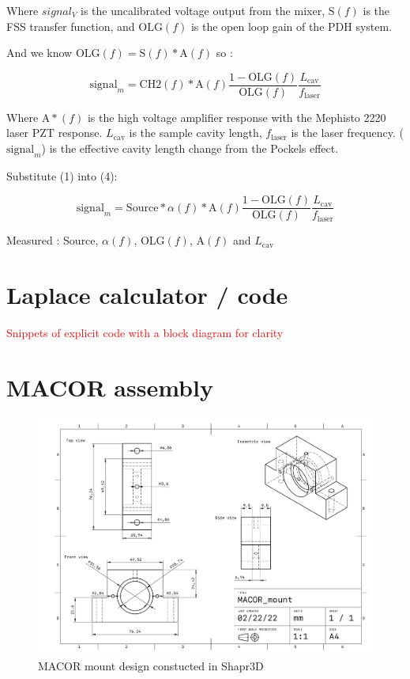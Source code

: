 Where $signal_V$ is the uncalibrated voltage output from the mixer, $\mathrm{S}(f)$ is the FSS transfer function, and $\mathrm{OLG}(f)$ is the open loop gain of the PDH system.

And we know $\mathrm{OLG}(f) = \mathrm{S}(f)*\mathrm{A}(f)$ so :

\begin{equation}
\mathrm{signal}_m = \mathrm{CH2}(f)*\mathrm{A}(f) \frac{1-\mathrm{OLG}(f)}{\mathrm{OLG}(f)} \frac{L_\mathrm{cav}}{f_\mathrm{laser}}
\end{equation}

Where $\mathrm{A}*(f)$ is the high voltage amplifier response with the Mephisto 2220 laser PZT response. $L_\mathrm{cav}$ is the sample cavity length, $f_\mathrm{laser}$ is the laser frequency. ($\mathrm{signal}_m$)  is the effective cavity length change from the Pockels effect.

Substitute (1) into (4):

\begin{equation}
\mathrm{signal}_m = \mathrm{Source} * \alpha(f) * \mathrm{A}(f) \frac{1-\mathrm{OLG}(f)}{\mathrm{OLG}(f)} \frac{L_\mathrm{cav}}{f_\mathrm{laser}}
\end{equation}

Measured :
Source, $\alpha (f)$, OLG$(f)$, A$(f)$ and $L_\mathrm{cav}$

\section{Laplace calculator / code}

\textcolor{red}{Snippets of explicit code with a block diagram for clarity}

\section{MACOR assembly}

\begin{figure}[H]
\includegraphics[width=\textwidth]{figs/ALGAAS/MACOR_mount.pdf}
\caption{MACOR mount design constucted in Shapr3D}
\label{fig:macor_mount_design}
\end{figure}


